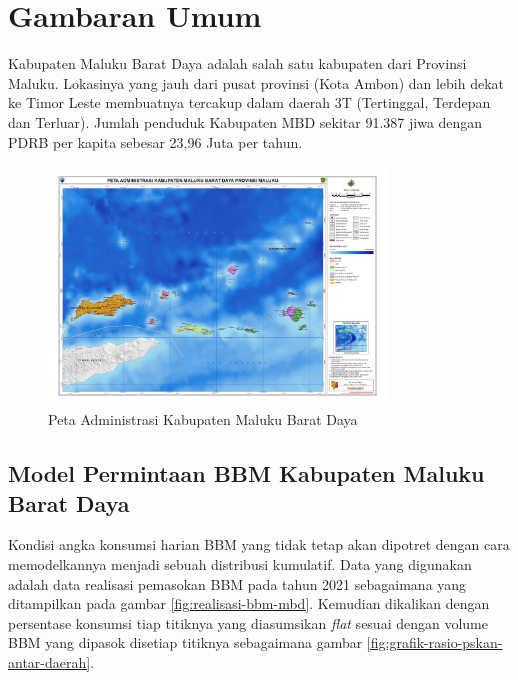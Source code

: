 \section{Gambaran Umum}
\label{sec:gambaran-umum}

Kabupaten Maluku Barat Daya adalah salah satu kabupaten dari Provinsi Maluku. Lokasinya yang jauh dari pusat provinsi (Kota Ambon) dan lebih dekat ke Timor Leste membuatnya tercakup dalam daerah 3T (Tertinggal, Terdepan dan Terluar). Jumlah penduduk Kabupaten MBD sekitar 91.387 jiwa dengan PDRB per kapita sebesar 23,96 Juta per tahun.

\begin{figure}[ht!]
    \centering
    \includegraphics[width=0.8\textwidth]{gambar/administrasi-maluku-barat-daya-a1.jpg}
    \caption{Peta Administrasi Kabupaten Maluku Barat Daya \citep{Peta_Tematik_Indonesia_2014}}
    \label{fig:peta-mbd-basic}
\end{figure}

\subsection{Model Permintaan BBM Kabupaten Maluku Barat Daya}
\label{subsec:variasi-konsumsi-bbm-day}

Kondisi angka konsumsi harian BBM yang tidak tetap akan dipotret dengan cara memodelkannya menjadi sebuah distribusi kumulatif. Data yang digunakan adalah data realisasi pemasokan BBM pada tahun 2021 sebagaimana yang ditampilkan pada gambar \ref{fig:realisasi-bbm-mbd}. Kemudian dikalikan dengan persentase konsumsi tiap titiknya yang diasumsikan \emph{flat} sesuai dengan volume BBM yang dipasok disetiap titiknya sebagaimana gambar \ref{fig:grafik-rasio-pskan-antar-daerah}.

